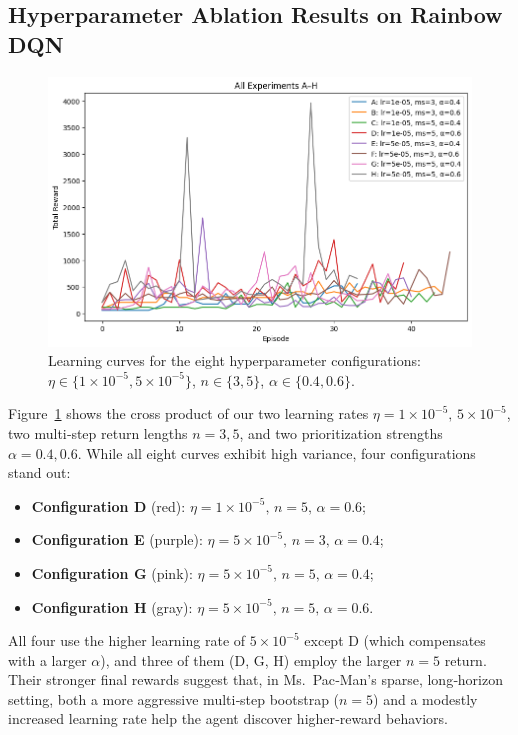 \documentclass{article}
\begin{document}
\subsection{Hyperparameter Ablation Results on Rainbow DQN}

\begin{figure}[ht]
  \centering
  \includegraphics[width=0.8\linewidth]{rainbow_8Regular.png}
  \caption{Learning curves for the eight hyperparameter configurations:
           \(\eta\in\{1\times10^{-5},5\times10^{-5}\}\), 
           \(n\in\{3,5\}\), 
           \(\alpha\in\{0.4,0.6\}\).}
  \label{fig:ablation}
\end{figure}

Figure~\ref{fig:ablation} shows the cross product of our two learning rates \(\eta=1\times10^{-5},\,5\times10^{-5}\), two multi‐step return lengths \(n=3,5\), and two prioritization strengths \(\alpha=0.4,0.6\). While all eight curves exhibit high variance, four configurations stand out:

\begin{itemize}
  \item \textbf{Configuration D} (red): \(\eta=1\times10^{-5},\,n=5,\,\alpha=0.6\);
  \item \textbf{Configuration E} (purple): \(\eta=5\times10^{-5},\,n=3,\,\alpha=0.4\);
  \item \textbf{Configuration G} (pink): \(\eta=5\times10^{-5},\,n=5,\,\alpha=0.4\);
  \item \textbf{Configuration H} (gray): \(\eta=5\times10^{-5},\,n=5,\,\alpha=0.6\).
\end{itemize}

All four use the higher learning rate of \(5\times10^{-5}\) except D (which compensates with a larger \(\alpha\)), and three of them (D, G, H) employ the larger \(n=5\) return. Their stronger final rewards suggest that, in Ms.\ Pac‑Man’s sparse, long‑horizon setting, both a more aggressive multi‑step bootstrap (\(n=5\)) and a modestly increased learning rate help the agent discover higher‑reward behaviors.
\end{document}
